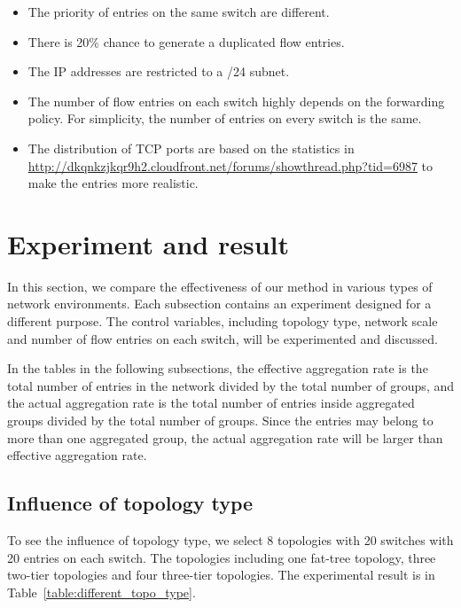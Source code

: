 \documentclass[conference]{IEEEtran}
\begin{document}
\begin{itemize}
\item
The priority of entries on the same switch are different.
\item
There is 20\% chance to generate a duplicated flow entries. 
\item
The IP addresses are restricted to a /24 subnet.
\item
The number of flow entries on each switch highly depends on the forwarding policy. For simplicity, the number of entries on every switch is the same. 
\item
The distribution of TCP ports are based on the statistics in \url{http://dkqnkzjkqr9h2.cloudfront.net/forums/showthread.php?tid=6987} to make the entries more realistic.
\end{itemize}

\section{Experiment and result}
In this section, we compare the effectiveness of our method in various types of network environments. Each subsection contains an experiment designed for a different purpose. The control variables, including topology type, network scale and number of flow entries on each switch, will be experimented and discussed. 

In the tables in the following subsections, the effective aggregation rate is the total number of entries in the network divided by the total number of groups, and the actual aggregation rate is the total number of entries inside aggregated groups divided by the total number of groups. Since the entries may belong to more than one aggregated group, the actual aggregation rate will be larger than effective aggregation rate. 

\subsection{Influence of topology type}
To see the influence of topology type, we select 8 topologies with 20 switches with 20 entries on each switch. The topologies including one fat-tree topology, three two-tier topologies and four three-tier topologies. The experimental result is in Table~\ref{table:different_topo_type}. 
\end{document}
